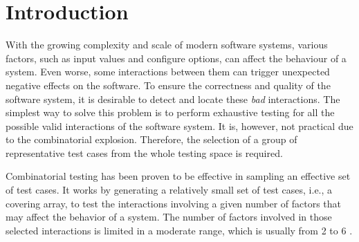 \documentclass[conference]{IEEEtran}
\theoremstyle{definition}
\begin{document}




%
\IEEEpeerreviewmaketitle



\section{Introduction}
With the growing complexity and scale of modern software systems, various factors, such as input values and configure options, can affect the behaviour of a system. Even worse, some interactions between them can trigger unexpected negative effects on the software. To ensure the correctness and quality of the software system, it is desirable to detect and locate these \emph{bad} interactions. The simplest way to solve this problem is to perform exhaustive testing for all the possible valid interactions of the software system. It is, however, not practical due to the combinatorial explosion. Therefore, the selection of a group of representative test cases from the whole testing space is required.

Combinatorial testing has been proven to be effective in sampling an effective set of test cases\cite{nie2011survey}. It works by generating a relatively small set of test cases, i.e., a covering array, to test the interactions involving a given number of factors that may affect the behavior of a system. The number of factors involved in those selected interactions is limited in a moderate range, which is usually from 2 to 6 \cite{kuhn2002investigation}.

\end{document}
